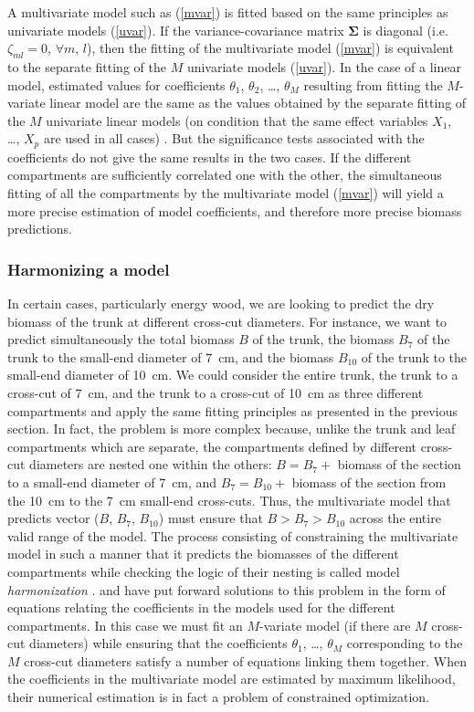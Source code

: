 A multivariate model such as (\ref{mvar}) is fitted based on the same principles as univariate models (\ref{uvar}). If the variance-covariance matrix $\boldsymbol{\Sigma}$ is diagonal (i.e. $\zeta_{ml}=0$, $\forall m$, $l$), then the fitting of the multivariate model (\ref{mvar}) is equivalent to the separate fitting of the $M$ univariate models (\ref{uvar}). In the case of a linear model, estimated values for coefficients $\theta_1$, $\theta_2$, \ldots, $\theta_M$ resulting from fitting the $M$-variate linear model are the same as the values obtained by the separate fitting of the $M$ univariate linear models (on condition that the same effect variables $X_1$, \ldots, $X_p$ are used in all cases) \citep[chapter 3]{muller06}. But the significance tests associated with the coefficients do not give the same results in the two cases. If the different compartments are sufficiently correlated one with the other, the simultaneous fitting of all the compartments by the multivariate model (\ref{mvar}) will yield a more precise estimation of model coefficients, and therefore more precise biomass predictions.

\subsubsection{Harmonizing a model}

In certain cases, particularly energy wood, we are looking to predict the dry biomass of the trunk at different cross-cut diameters. For instance, we want to predict simultaneously the total biomass $B$ of the trunk, the biomass $B_{7}$ of the trunk to the small-end diameter of 7~cm, and the biomass $B_{10}$ of the trunk to the small-end diameter of 10~cm. We could consider the entire trunk, the trunk to a cross-cut of 7~cm, and the trunk to a cross-cut of 10~cm as three different compartments and apply the same fitting principles as presented in the previous section. In fact, the problem is more complex because, unlike the trunk and leaf compartments which are separate, the compartments defined by different cross-cut diameters are nested one within the others: $B=B_{7}+$ biomass of the section to a small-end diameter of 7~cm, and $B_{7}=B_{10}+$ biomass of the section from the 10~cm to the 7~cm small-end cross-cuts. Thus, the multivariate model that predicts vector ($B$, $B_7$, $B_{10}$) must ensure that $B>B_{7}>B_{10}$ across the entire valid range of the model. The process consisting of constraining the multivariate model in such a manner that it predicts the biomasses of the different compartments while checking the logic of their nesting is called model \emph{harmonization} \citep{parresol99}. \citet{jacobs80} and \citet{cunia85} have put forward solutions to this problem in the form of equations relating the coefficients in the models used for the different compartments. In this case we must fit an $M$-variate model (if there are $M$ cross-cut diameters) while ensuring that the coefficients $\theta_1$, \ldots, $\theta_M$ corresponding to the $M$ cross-cut diameters satisfy a number of equations linking them together. When the coefficients in the multivariate model are estimated by maximum likelihood, their numerical estimation is in fact a problem of constrained optimization.

